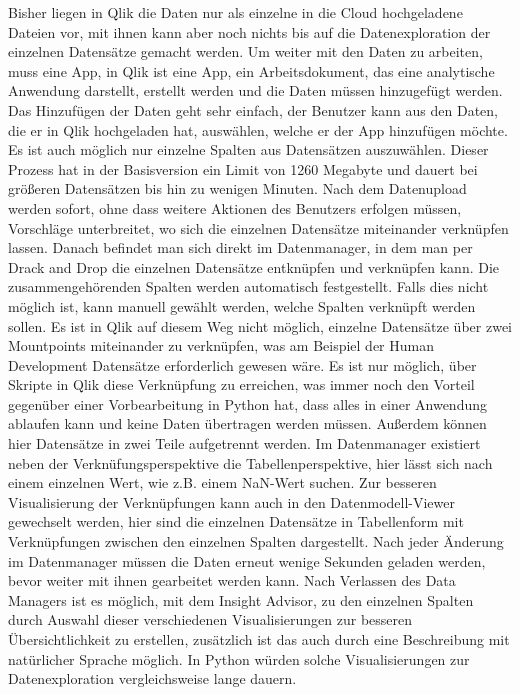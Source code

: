 \documentclass[12pt]{article}
\begin{document}
	Bisher liegen in Qlik die Daten nur als einzelne in die Cloud hochgeladene Dateien vor, mit ihnen kann aber noch nichts bis auf die Datenexploration der einzelnen Datensätze gemacht werden. Um weiter mit den Daten zu arbeiten, muss eine App, in Qlik ist eine App, ein Arbeitsdokument, das eine analytische Anwendung darstellt, erstellt werden und die Daten müssen hinzugefügt werden. Das Hinzufügen der Daten geht sehr einfach, der Benutzer kann aus den Daten, die er in Qlik hochgeladen hat, auswählen, welche er der App hinzufügen möchte. Es ist auch möglich nur einzelne Spalten aus Datensätzen auszuwählen. Dieser Prozess hat in der Basisversion ein Limit von 1260 Megabyte und dauert bei größeren Datensätzen bis hin zu wenigen Minuten.
	Nach dem Datenupload werden sofort, ohne dass weitere Aktionen des Benutzers erfolgen müssen, Vorschläge unterbreitet, wo sich die einzelnen Datensätze miteinander verknüpfen lassen. Danach befindet man sich direkt im Datenmanager, in dem man per Drack and Drop die einzelnen Datensätze entknüpfen und verknüpfen kann. Die zusammengehörenden Spalten werden automatisch festgestellt. Falls dies nicht möglich ist, kann manuell gewählt werden, welche Spalten verknüpft werden sollen.
	Es ist in Qlik auf diesem Weg nicht möglich, einzelne Datensätze über zwei Mountpoints miteinander zu verknüpfen, was am Beispiel der Human Development Datensätze erforderlich gewesen wäre. Es ist nur möglich, über Skripte in Qlik diese Verknüpfung zu erreichen, was immer noch den Vorteil gegenüber einer Vorbearbeitung in Python hat, dass alles in einer Anwendung ablaufen kann und keine Daten übertragen werden müssen.
	Außerdem können hier Datensätze in zwei Teile aufgetrennt werden.
	Im Datenmanager existiert neben der Verknüfungsperspektive die Tabellenperspektive, hier lässt sich nach einem einzelnen Wert, wie z.B. einem NaN-Wert suchen.
	Zur besseren Visualisierung der Verknüpfungen kann auch in den Datenmodell-Viewer gewechselt werden, hier sind die einzelnen Datensätze in Tabellenform mit Verknüpfungen zwischen den einzelnen Spalten dargestellt.
	Nach jeder Änderung im Datenmanager müssen die Daten erneut wenige Sekunden geladen werden, bevor weiter mit ihnen gearbeitet werden kann.
	Nach Verlassen des Data Managers ist es möglich, mit dem Insight Advisor, zu den einzelnen Spalten durch 
	Auswahl dieser verschiedenen Visualisierungen zur besseren Übersichtlichkeit zu erstellen, zusätzlich ist das auch durch eine Beschreibung mit natürlicher Sprache möglich. In Python würden solche Visualisierungen zur Datenexploration vergleichsweise lange dauern.
	
\end{document}
